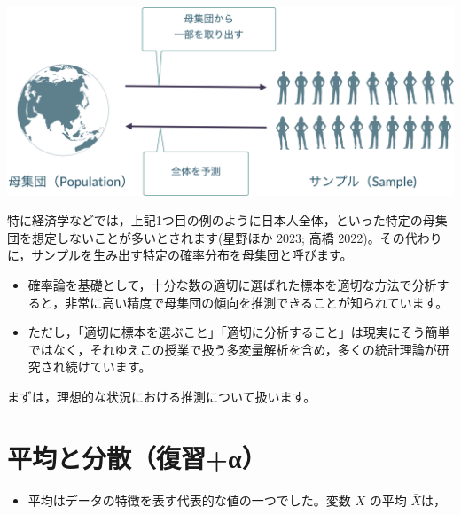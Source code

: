 \documentclass[
  letterpaper,
  DIV=11,
  numbers=noendperiod]{scrreprt}
\providecommand{\tightlist}{%
  \setlength{\itemsep}{0pt}\setlength{\parskip}{0pt}}\usepackage{longtable,booktabs,array}
\begin{document}
\includegraphics{images/Untitled-01.png}

\begin{tcolorbox}[enhanced jigsaw, colframe=quarto-callout-note-color-frame, left=2mm, breakable, opacityback=0, arc=.35mm, rightrule=.15mm, title=\textcolor{quarto-callout-note-color}{\faInfo}\hspace{0.5em}{Note}, opacitybacktitle=0.6, colback=white, colbacktitle=quarto-callout-note-color!10!white, toprule=.15mm, bottomtitle=1mm, toptitle=1mm, leftrule=.75mm, titlerule=0mm, coltitle=black, bottomrule=.15mm]

特に経済学などでは，上記1つ目の例のように日本人全体，といった特定の母集団を想定しないことが多いとされます(星野ほか
2023; 高橋
2022)。その代わりに，サンプルを生み出す特定の確率分布を母集団と呼びます。

\end{tcolorbox}

\begin{itemize}
\item
  確率論を基礎として，十分な数の適切に選ばれた標本を適切な方法で分析すると，非常に高い精度で母集団の傾向を推測できることが知られています。
\item
  ただし，「適切に標本を選ぶこと」「適切に分析すること」は現実にそう簡単ではなく，それゆえこの授業で扱う多変量解析を含め，多くの統計理論が研究され続けています。
\end{itemize}

まずは，理想的な状況における推測について扱います。

\hypertarget{ux5e73ux5747ux3068ux5206ux6563ux5fa9ux7fd2ux3b1}{%
\chapter{平均と分散（復習+α）}\label{ux5e73ux5747ux3068ux5206ux6563ux5fa9ux7fd2ux3b1}}

\begin{itemize}
\tightlist
\item
  平均はデータの特徴を表す代表的な値の一つでした。変数 \(X\) の平均
  \(\bar X\)は，
\end{itemize}
\end{document}
